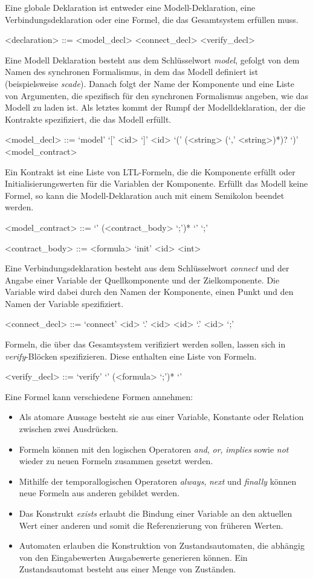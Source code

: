 Eine globale Deklaration ist entweder eine Modell-Deklaration, eine Verbindungsdeklaration oder eine Formel, die das Gesamtsystem erfüllen muss.
\begin{grammar}
  <declaration> ::= <model\_decl>
  \alt <connect\_decl>
  \alt <verify\_decl>
\end{grammar}
Eine Modell Deklaration besteht aus dem Schlüsselwort \emph{model}, gefolgt von dem Namen des synchronen Formalismus, in dem das Modell definiert ist (beispielsweise \emph{scade}).
Danach folgt der Name der Komponente und eine Liste von Argumenten, die spezifisch für den synchronen Formalismus angeben, wie das Modell zu laden ist.
Als letztes kommt der Rumpf der Modelldeklaration, der die Kontrakte spezifiziert, die das Modell erfüllt.
\begin{grammar}
  <model\_decl> ::= `model' `[' <id> `]' <id> `(' (<string> (`,' <string>)*)? `)' <model\_contract>
\end{grammar}
Ein Kontrakt ist eine Liste von LTL-Formeln, die die Komponente erfüllt oder Initialisierungswerten für die Variablen der Komponente.
Erfüllt das Modell keine Formel, so kann die Modell-Deklaration auch mit einem Semikolon beendet werden.
\begin{grammar}
  <model\_contract> ::= `{' (<contract\_body> `;')* `}'
  \alt `;'

  <contract\_body> ::= <formula>
  \alt `init' <id> <int>
\end{grammar}
Eine Verbindungsdeklaration besteht aus dem Schlüsselwort \emph{connect} und der Angabe einer Variable der Quellkomponente und der Zielkomponente.
Die Variable wird dabei durch den Namen der Komponente, einen Punkt und den Namen der Variable spezifiziert.
\begin{grammar}
  <connect\_decl> ::= `connect' <id> `.' <id> <id> `.' <id> `;'
\end{grammar}
Formeln, die über das Gesamtsystem verifiziert werden sollen, lassen sich in \emph{verify}-Blöcken spezifizieren.
Diese enthalten eine Liste von Formeln.
\begin{grammar}
  <verify\_decl> ::= `verify' `{' (<formula> `;')* `}'
\end{grammar}
Eine Formel kann verschiedene Formen annehmen:
\begin{itemize}
\item Als atomare Aussage besteht sie aus einer Variable, Konstante oder Relation zwischen zwei Ausdrücken.
\item Formeln können mit den logischen Operatoren \emph{and}, \emph{or}, \emph{implies} sowie \emph{not} wieder zu neuen Formeln zusammen gesetzt werden.
\item Mithilfe der temporallogischen Operatoren \emph{always}, \emph{next} und \emph{finally} können neue Formeln aus anderen gebildet werden.
\item Das Konstrukt \emph{exists} erlaubt die Bindung einer Variable an den aktuellen Wert einer anderen und somit die Referenzierung von früheren Werten.
\item Automaten erlauben die Konstruktion von Zustandsautomaten, die abhängig von den Eingabewerten Ausgabewerte generieren können.
  Ein Zustandsautomat besteht aus einer Menge von Zuständen.
\end{itemize}
